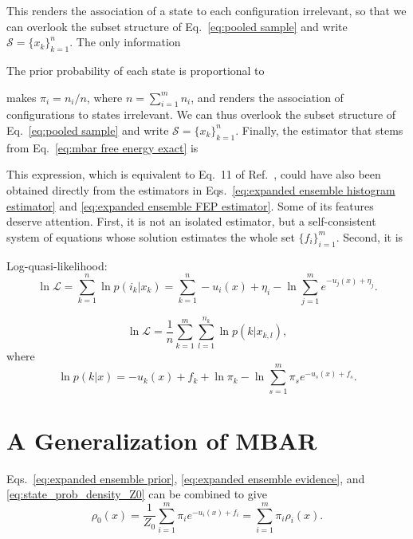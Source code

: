 \documentclass[aip,jcp,preprint,amsmath,amssymb]{revtex4-1}
\begin{document}
This renders the association of a state to each configuration irrelevant, so that we can overlook the subset structure of Eq.~\eqref{eq:pooled sample} and write $\mathcal S = \{x_k\}_{k=1}^n$. The only information 

The prior probability of each state is proportional to 

makes $\pi_i = n_i/n$, where $n = \sum_{i=1}^m n_i$, and renders the association of configurations to states irrelevant. We can thus overlook the subset structure of Eq.~\eqref{eq:pooled sample} and write $\mathcal S = \{x_k\}_{k=1}^n$. Finally, the estimator that stems from Eq.~\eqref{eq:mbar free energy exact} is

This expression, which is equivalent to Eq.~11 of Ref.~, could have also been obtained directly from the estimators in Eqs.~\eqref{eq:expanded ensemble histogram estimator} and \eqref{eq:expanded ensemble FEP estimator}. Some of its features deserve attention. First, it is not an isolated estimator, but a self-consistent system of equations whose solution estimates the whole set $\{f_i\}_{i=1}^m$. Second, it is 

Log-quasi-likelihood:\cite{Geyer_1994}
\begin{equation*}
\ln \mathcal L = \sum_{k=1}^n \ln p(i_k|x_k) = \sum_{k=1}^n -u_i(x) + \eta_i - \ln \sum_{j=1}^m e^{-u_j(x) + \eta_j}.
\end{equation*}

\begin{equation}
\label{eq:mbar log quasi-likelihood}
\ln \mathcal L = \frac{1}{n} \sum_{k=1}^m \sum_{l=1}^{n_k} \ln p(k|x_{k,l}),
\end{equation}
where
\begin{equation*}
\ln p(k|x) = -u_k(x) + f_k + \ln \pi_k - \ln \sum_{s=1}^m \pi_s e^{-u_s(x) + f_s}.
\end{equation*}


\section{A Generalization of MBAR}

Eqs.~\eqref{eq:expanded ensemble prior}, \eqref{eq:expanded ensemble evidence}, and \eqref{eq:state_prob_density_Z0} can be combined to give
\begin{equation*}
\rho_0(x) = \frac{1}{Z_0} \sum_{i=1}^m \pi_i e^{-u_i(x) + f_i} = \sum_{i=1}^m \pi_i \rho_i(x).
\end{equation*}
\end{document}
